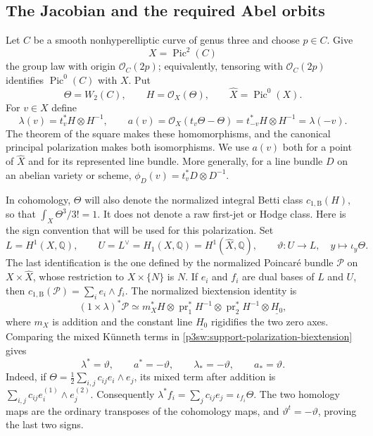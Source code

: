 \documentclass[11pt]{article}
\newcommand{\Q}{\mathbb Q}
\numberwithin{equation}{section}
\begin{document}
\subsection{The Jacobian and the required Abel orbits}

Let \(C\) be a smooth nonhyperelliptic curve of genus three and choose
\(p\in C\).  Give
\[
 X=\operatorname{Pic}^{2}(C)
\]
the group law with origin \(\mathcal O_C(2p)\); equivalently, tensoring
with \(\mathcal O_C(2p)\) identifies \(\operatorname{Pic}^0(C)\) with
\(X\).  Put
\[
 \Theta=W_2(C),\qquad H=\mathcal O_X(\Theta),\qquad
 \widehat X=\operatorname{Pic}^0(X).
\]
For \(v\in X\) define
\begin{equation}
 \lambda(v)=t_v^*H\otimes H^{-1},\qquad
 a(v)=\mathcal O_X(t_v\Theta-\Theta)
     =t_{-v}^*H\otimes H^{-1}=\lambda(-v).
 \label{p3sw:support-lambda-a}
\end{equation}
The theorem of the square makes these homomorphisms, and the canonical
principal polarization makes both isomorphisms.  We use \(a(v)\) both
for a point of \(\widehat X\) and for its represented line bundle.
More generally, for a line bundle \(D\) on an abelian variety or
scheme, \(\phi_D(v)=t_v^*D\otimes D^{-1}\).

In cohomology, \(\Theta\) will also denote the normalized integral Betti
class \(c_{1,\mathrm B}(H)\), so that
\(\int_X\Theta^3/3!=1\).  It does not denote a raw first-jet or Hodge
class.  Here is the sign convention that will be used for this
polarization.  Set
\begin{equation}
 L=H^1(X,\Q),\qquad U=L^\vee=H_1(X,\Q)=H^1(\widehat X,\Q),
 \qquad
 \vartheta:U\longrightarrow L,\quad y\longmapsto\iota_y\Theta.
 \label{p3sw:support-betti-convention}
\end{equation}
The last identification is the one defined by the normalized Poincar\'e
bundle \(\mathcal P\) on \(X\times\widehat X\), whose restriction to
\(X\times\{N\}\) is \(N\).  If \(e_i\) and \(f_i\) are dual bases of
\(L\) and \(U\), then
\(c_{1,\mathrm B}(\mathcal P)=\sum_i e_i\wedge f_i\).
The normalized biextension identity is
\begin{equation}
 (1\times\lambda)^*\mathcal P
 \simeq m_X^*H\otimes\operatorname{pr}_1^*H^{-1}
              \otimes\operatorname{pr}_2^*H^{-1}
              \otimes\underline{H_0},
 \label{p3sw:support-polarization-biextension}
\end{equation}
where \(m_X\) is addition and the constant line \(\underline{H_0}\)
rigidifies the two zero axes.  Comparing the mixed K\"unneth terms in
\eqref{p3sw:support-polarization-biextension} gives
\begin{equation}
 \lambda^*=\vartheta,\qquad a^*=-\vartheta,\qquad
 \lambda_*=-\vartheta,\qquad a_*=\vartheta.
 \label{p3sw:support-polarization-signs}
\end{equation}
Indeed, if
\(\Theta=\frac12\sum_{i,j}c_{ij}e_i\wedge e_j\), its mixed term
after addition is
\(\sum_{i,j}c_{ij}e_i^{(1)}\wedge e_j^{(2)}\).  Consequently
\(\lambda^*f_i=\sum_jc_{ij}e_j=\iota_{f_i}\Theta\).
The two homology maps are the ordinary transposes of the cohomology
maps, and \(\vartheta^t=-\vartheta\), proving the last two signs.
\end{document}
